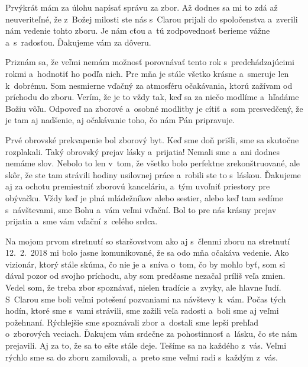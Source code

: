 


Prvýkrát mám za úlohu napísať správu za zbor. Až dodnes sa mi to zdá až neuveriteľné, že z~Božej milosti ste nás s~Clarou  prijali do spoločenstva a~zverili nám vedenie tohto zboru. Je nám cťou a~tú zodpovednosť berieme vážne a~s~radosťou.  Ďakujeme vám za dôveru.

Priznám sa, že veľmi nemám možnosť  porovnávať tento rok s~predchádzajúcimi rokmi a~hodnotiť ho podľa nich. Pre mňa je stále všetko krásne a~smeruje len k~dobrému.  Som nesmierne vďačný za atmosféru očakávania, ktorú zažívam od príchodu do zboru. Verím, že je to vždy tak, keď sa za niečo modlíme a~hľadáme Božiu vôľu. Odpoveď na zborové a~osobné modlitby je cítiť a~som presvedčený, že je tam aj nadšenie, aj očakávanie toho, čo nám Pán pripravuje.

Prvé obrovské prekvapenie bol zborový byt. Keď sme doň prišli, sme sa skutočne rozplakali. Taký obrovský prejav lásky a~prijatia! Nemali sme a~ani dodnes nemáme slov. Nebolo to len v~tom, že všetko bolo perfektne zrekonštruované, ale skôr, že ste tam strávili hodiny usilovnej práce a~robili ste to s~láskou. Ďakujeme aj za ochotu premiestniť zborovú kanceláriu, a~tým uvoľniť priestory pre obývačku. Vždy keď je plná mládežníkov alebo sestier, alebo keď tam sedíme s~návštevami, sme Bohu a~vám veľmi vďační. Bol to pre nás krásny prejav prijatia a~sme vám vďační z~celého srdca.

Na mojom prvom stretnutí so staršovstvom ako aj s~členmi zboru na stretnutí 12.~2.~2018 mi bolo jasne komunikované, že sa odo mňa očakáva vedenie. Ako vizionár, ktorý stále skúma, čo nie je a~sníva o~tom, čo by mohlo byť, som si dával pozor od svojho príchodu, aby som predčasne nezačal príliš veľa zmien. Vedel som, že treba zbor spoznávať, nielen tradície a~zvyky, ale hlavne ľudí. S~Clarou sme boli veľmi potešení pozvaniami na návštevy k~vám. Počas tých hodín, ktoré sme s~vami strávili, sme zažili veľa radosti a~boli sme aj veľmi požehnaní. Rýchlejšie sme spoznávali zbor a~dostali sme lepší prehľad o~zborových veciach. Ďakujem vám srdečne za pohostinnosť a~lásku, čo ste nám prejavili.  Aj za to, že sa to ešte stále deje. Tešíme sa na každého z~vás. Veľmi rýchlo sme sa do zboru zamilovali, a~preto sme veľmi radi s~každým z~vás.

